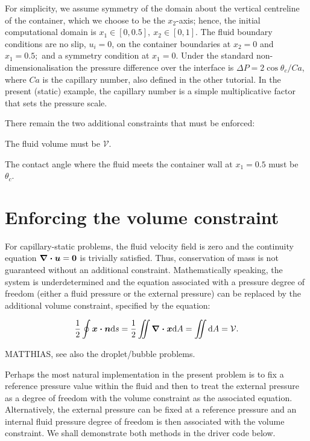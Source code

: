 For simplicity, we assume symmetry of the domain about the vertical centreline of the container, which we choose to be the $ x_{2} $-\/axis; hence, the initial computational domain is $ x_{1} \in [0,0.5],\ x_{2} \in [0,1] $. The fluid boundary conditions are no slip, $ u_{i} = 0 $, on the container boundaries at $ x_{2} =0 $ and $ x_{1} = 0.5; $ and a symmetry condition at $ x_{1} = 0 $. Under the standard non-\/dimensionalisation the pressure difference over the interface is $ \Delta P = 2\cos\theta_{c}/Ca $, where $ Ca $ is the capillary number, also defined in the other tutorial. In the present (static) example, the capillary number is a simple multiplicative factor that sets the pressure scale.

There remain the two additional constraints that must be enforced\+:
\begin{DoxyEnumerate}
\item The fluid volume must be $ \mathcal{V} $.
\item The contact angle where the fluid meets the container wall at $ x_{1} = 0.5 $ must be $ \theta_{c}. $
\end{DoxyEnumerate}\hypertarget{index_vol_const}{}\section{Enforcing the volume constraint}\label{index_vol_const}
For capillary-\/static problems, the fluid velocity field is zero and the continuity equation $ \mbox{\boldmath$\nabla\cdot u$} = \mbox{\boldmath$0$} $ is trivially satisfied. Thus, conservation of mass is not guaranteed without an additional constraint. Mathematically speaking, the system is underdetermined and the equation associated with a pressure degree of freedom (either a fluid pressure or the external pressure) can be replaced by the additional volume constraint, specified by the equation\+:

\[ \frac{1}{2} \oint \mbox{\boldmath$x\cdot n$} \mbox{d} s = \frac{1}{2} \int \hspace{-0.25cm} \int \mbox{\boldmath$\nabla\cdot x$} \mbox{d} A = \int \hspace{-0.25cm} \int \mbox{d} A = \mathcal{V}. \]

M\+A\+T\+T\+H\+I\+AS, see also the droplet/bubble problems.

Perhaps the most natural implementation in the present problem is to fix a reference pressure value within the fluid and then to treat the external pressure as a degree of freedom with the volume constraint as the associated equation. Alternatively, the external pressure can be fixed at a reference pressure and an internal fluid pressure degree of freedom is then associated with the volume constraint. We shall demonstrate both methods in the driver code below.

